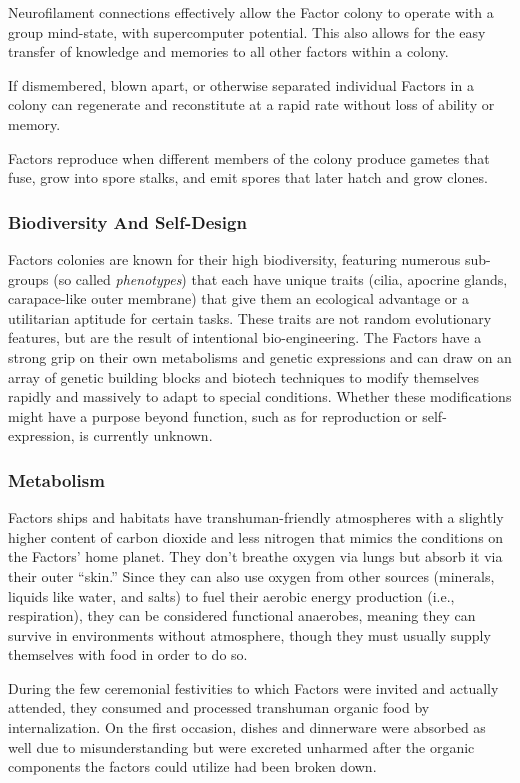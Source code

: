 Neurofilament connections effectively allow the Factor colony to operate with a group mind-state, with supercomputer potential. This also allows for the easy transfer of knowledge and memories to all other factors within a colony. 

If dismembered, blown apart, or otherwise separated individual Factors in a colony can regenerate and reconstitute at a rapid rate without loss of ability or memory. 

Factors reproduce when different members of the colony produce gametes that fuse, grow into spore stalks, and emit spores that later hatch and grow clones. 

\subsubsection{Biodiversity And Self-Design } 

Factors colonies are known for their high biodiversity, featuring numerous sub-groups (so called \textit{phenotypes}) that each have unique traits (cilia, apocrine glands, carapace-like outer membrane) that give them an ecological advantage or a utilitarian aptitude for certain tasks. These traits are not random evolutionary features, but are the result of intentional bio-engineering. The Factors have a strong grip on their own metabolisms and genetic expressions and can draw on an array of genetic building blocks and biotech techniques to modify themselves rapidly and massively to adapt to special conditions. Whether these modifications might have a purpose beyond function, such as for reproduction or self-expression, is currently unknown. 

\subsubsection{Metabolism } 

Factors ships and habitats have transhuman-friendly atmospheres with a slightly higher content of carbon dioxide and less nitrogen that mimics the conditions on the Factors' home planet. They don't breathe oxygen via lungs but absorb it via their outer ``skin.'' Since they can also use oxygen from other sources (minerals, liquids like water, and salts) to fuel their aerobic energy production (i.e., respiration), they can be considered functional anaerobes, meaning they can survive in environments without atmosphere, though they must usually supply themselves with food in order to do so. 

During the few ceremonial festivities to which Factors were invited and actually attended, they consumed and processed transhuman organic food by internalization. On the first occasion, dishes and dinnerware were absorbed as well due to misunderstanding but were excreted unharmed after the organic components the factors could utilize had been broken down. 

